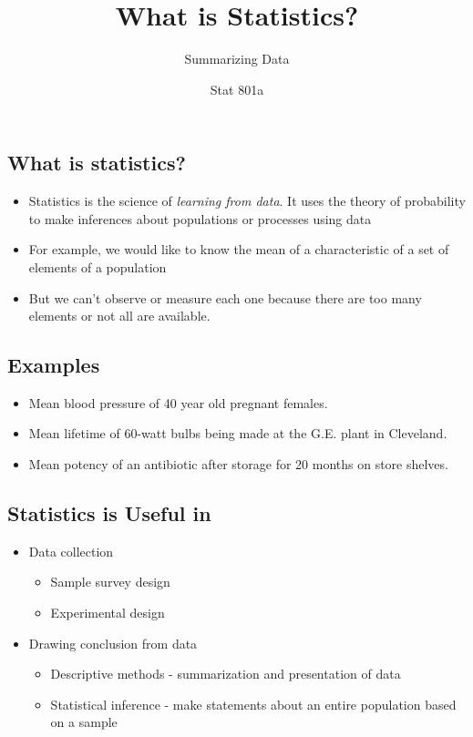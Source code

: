 \documentclass[
  letterpaper,
  DIV=11,
  numbers=noendperiod]{scrartcl}
\title{What is Statistics?}
\subtitle{Summarizing Data}
\author{Stat 801a}
\date{}
\begin{document}
\maketitle


\subsection{What is statistics?}\label{what-is-statistics}

\begin{itemize}
\item
  Statistics is the science of {\emph{learning from data}}. It uses the
  theory of probability to make inferences about populations or
  processes using data
\item
  For example, we would like to know the mean of a characteristic of a
  set of elements of a population
\item
  But we can't observe or measure each one because there are too many
  elements or not all are available.
\end{itemize}

\subsection{Examples}\label{examples}

\begin{itemize}
\item
  Mean blood pressure of 40 year old pregnant females.
\item
  Mean lifetime of 60-watt bulbs being made at the G.E. plant in
  Cleveland.
\item
  Mean potency of an antibiotic after storage for 20 months on store
  shelves.
\end{itemize}

\subsection{Statistics is Useful in}\label{statistics-is-useful-in}

\begin{itemize}
\item
  Data collection

  \begin{itemize}
  \item
    Sample survey design
  \item
    Experimental design
  \end{itemize}
\item
  Drawing conclusion from data

  \begin{itemize}
  \item
    {Descriptive} methods - summarization and presentation of data
  \item
    {Statistical} inference - make statements about an entire population
    based on a sample
  \end{itemize}
\end{itemize}
\end{document}
